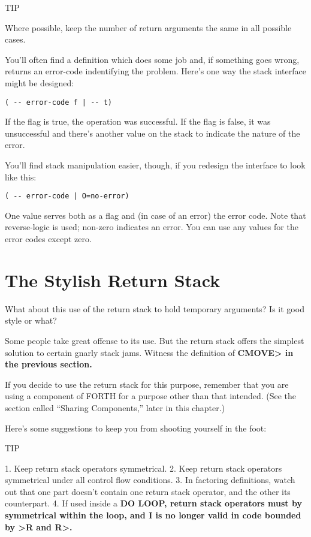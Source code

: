 TIP

Where possible, keep the number of return arguments the same in all
possible cases.

You'll often find a definition which does some job and, if something goes
wrong, returns an error-code indentifying the problem. Here's one way
the stack interface might be designed:

\begin{verbatim}
( -- error-code f | -- t)
\end{verbatim}

If the flag is true, the operation was successful. If the flag is false, it was
unsuccessful and there's another value on the stack to indicate the nature
of the error.

You'll find stack manipulation easier, though, if you redesign the interface
to look like this:

\begin{verbatim}
( -- error-code | O=no-error)
\end{verbatim}

One value serves both as a flag and (in case of an error) the error code.
Note that reverse-logic is used; non-zero indicates an error. You can use
any values for the error codes except zero.

\section{The Stylish Return Stack}

What about this use of the return stack to hold temporary arguments? Is
it good style or what?

Some people take great offense to its use. But the return stack
offers the simplest solution to certain gnarly stack jams. Witness the
definition of \bf{CMOVE>} in the previous section.

If you decide to use the return stack for this purpose, remember
that you are using a component of FORTH for a purpose other than that
intended. (See the section called ``Sharing Components,'' later in this
chapter.)

Here's some suggestions to keep you from shooting yourself in the
foot:

TIP

1. Keep return stack operators symmetrical.
2. Keep return stack operators symmetrical under all control flow
   conditions.
3. In factoring definitions, watch out that one part doesn't contain one
   return stack operator, and the other its counterpart.
4. If used inside a \bf{DO LOOP}, return stack operators must by symmetrical
   within the loop, and \bf{I} is no longer valid in code bounded by
   \bf{>R} and \bf{R>}.

